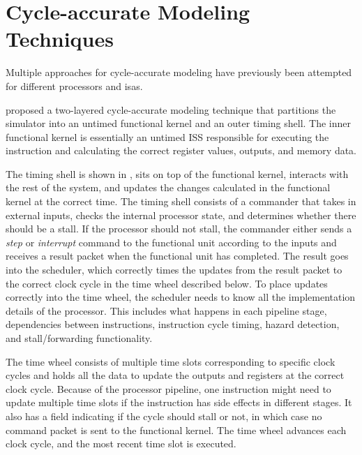 
\section{Cycle-accurate Modeling Techniques}
\label{sec:bg_cycle-accurate}

Multiple approaches for cycle-accurate modeling have previously been attempted for different processors and \acrshort{isa}s.

\textcite{chiangEfficientTwolayeredCycleaccurate2009} proposed a two-layered cycle-accurate modeling technique that partitions the simulator into an untimed functional kernel and an outer timing shell. The inner functional kernel is essentially an untimed ISS responsible for executing the instruction and calculating the correct register values, outputs, and memory data.

The timing shell is shown in , sits on top of the functional kernel, interacts with the rest of the system, and updates the changes calculated in the functional kernel at the correct time. The timing shell consists of a commander that takes in external inputs, checks the internal processor state, and determines whether there should be a stall. If the processor should not stall, the commander either sends a \textit{step} or \textit{interrupt} command to the functional unit according to the inputs and receives a result packet when the functional unit has completed. The result goes into the scheduler, which correctly times the updates from the result packet to the correct clock cycle in the time wheel described below. To place updates correctly into the time wheel, the scheduler needs to know all the implementation details of the processor. This includes what happens in each pipeline stage, dependencies between instructions, instruction cycle timing, hazard detection, and stall/forwarding functionality. 

The time wheel consists of multiple time slots corresponding to specific clock cycles and holds all the data to update the outputs and registers at the correct clock cycle. Because of the processor pipeline, one instruction might need to update multiple time slots if the instruction has side effects in different stages. It also has a field indicating if the cycle should stall or not, in which case no command packet is sent to the functional kernel. The time wheel advances each clock cycle, and the most recent time slot is executed.

